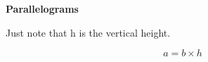 \item{\textbf{Parallelograms}}
  
Just note that h is the vertical height.

$$ a = {b} \times {h} $$

